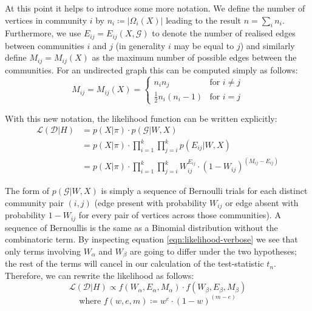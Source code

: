 \documentclass[]{article}
\newcommand{\Dcal}{\mathcal{D}}
\newcommand{\Gcal}{\mathcal{G}}
\newcommand{\lik}{\mathcal{L}}
\begin{document}
At this point it helps to introduce some more notation. We define the number of vertices in community $i$ by $n_i \coloneqq |\Omega_i(X)|$ leading to the result $n = \sum_i n_i$. Furthermore, we use $E_{ij} = E_{ij}(X, \Gcal)$ to denote the number of realised edges between communities $i$ and $j$ (in generality $i$ may be equal to $j$) and similarly define $M_{ij} = M_{ij}(X)$ as the maximum number of possible edges between the communities. For an undirected graph this can be computed simply as follows:
%
\begin{equation}
	M_{ij} = M_{ij} (X) = \begin{cases}
		n_i n_j &\text{for } i \neq j \\
		\frac{1}{2}n_i (n_i - 1) &\text{for } i = j
	\end{cases}
\end{equation}

With this new notation, the likelihood function can be written explicitly:
%
\begin{align}
\lik(\Dcal | H) &= p(X| \pi) \cdot p(\Gcal | W, X) \nonumber \\
&= p(X | \pi) \cdot \prod_{i=1}^{k} \prod_{j=i}^{k} p(E_{ij} | W, X) \nonumber \\
&= p(X | \pi) \cdot \prod_{i=1}^{k} \prod_{j=i}^{k} W_{ij} ^ {E_{ij}} \cdot \left( 1 - W_{ij} \right) ^ {(M_{ij} - E_{ij})}
\label{eqn:likelihood-verbose}
\end{align}

The form of $p(\Gcal | W, X)$ is simply a sequence of Bernoulli trials for each distinct community pair $(i, j)$ (edge present with probability $W_{ij}$ or edge absent with probability $1 - W_{ij}$ for every pair of vertices across those communities). A sequence of Bernoullis is the same as a Binomial distribution without the combinatoric term. By inspecting equation \ref{eqn:likelihood-verbose} we see that only terms involving $W_{\alpha}$ and $W_{\beta}$ are going to differ under the two hypotheses; the rest of the terms will cancel in our calculation of the test-statistic $t_n$. Therefore, we can rewrite the likelihood as follows:
%
\begin{equation}
	\lik (\Dcal | H) \propto f (W_\alpha, E_\alpha, M_\alpha) \cdot f (W_\beta, E_\beta, M_\beta)
\end{equation} 
\begin{equation}
	\textrm{where } f (w, e, m) \coloneqq w^e \cdot (1-w)^{(m - e)}
	\label{eqn:f-defn}
\end{equation}
\end{document}
